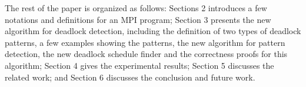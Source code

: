 The rest of the paper is organized as follows: Sections 2 introduces a few notations and definitions for an MPI program; Section 3 presents the new algorithm for deadlock detection, including the definition of two types of deadlock patterns, a few examples showing the patterns, the new algorithm for pattern detection, the new deadlock schedule finder and the correctness proofs for this algorithm; Section 4 gives the experimental results; Section 5 discusses the related work; and Section 6 discusses the conclusion and future work.
